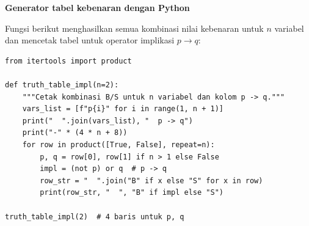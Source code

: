 \begin{contoh}
\textbf{Generator tabel kebenaran dengan Python} \cite{python_docs_boolean,levin_discrete}

Fungsi berikut menghasilkan semua kombinasi nilai kebenaran untuk $n$ variabel dan mencetak tabel untuk operator implikasi $p \to q$:

\begin{lstlisting}[style=pythonstyle, caption={Kombinasi nilai kebenaran dan tabel untuk $p \to q$}]
from itertools import product

def truth_table_impl(n=2):
    """Cetak kombinasi B/S untuk n variabel dan kolom p -> q."""
    vars_list = [f"p{i}" for i in range(1, n + 1)]
    print("  ".join(vars_list), "  p -> q")
    print("-" * (4 * n + 8))
    for row in product([True, False], repeat=n):
        p, q = row[0], row[1] if n > 1 else False
        impl = (not p) or q  # p -> q
        row_str = "  ".join("B" if x else "S" for x in row)
        print(row_str, "  ", "B" if impl else "S")

truth_table_impl(2)  # 4 baris untuk p, q
\end{lstlisting}
\end{contoh}
